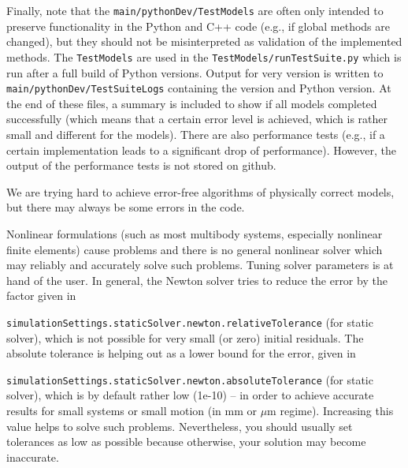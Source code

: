 Finally, note that the \texttt{main/pythonDev/TestModels} are often only intended to preserve functionality
in the Python and C++ code (e.g., if global methods are changed), but they should not be misinterpreted as validation of the 
implemented methods. The \texttt{TestModels} are used in the \codeName {} \texttt{TestModels/runTestSuite.py}
which is run after a full build of Python versions. Output for very version is written
to \texttt{main/pythonDev/TestSuiteLogs} containing the \codeName version and Python version. At the end of these
files, a summary is included to show if all models completed successfully (which means that a certain error level is achieved, which is rather small and different for the models).
There are also performance tests (e.g., if a certain implementation leads to a significant drop of performance).
However, the output of the performance tests is not stored on github.

We are trying hard to achieve error-free algorithms of physically correct models, but there may always be some errors in the code.

Nonlinear formulations (such as most multibody systems, especially nonlinear finite elements) cause problems and there is no general nonlinear solver which may reliably and accurately solve such problems.
Tuning solver parameters is at hand of the user. 
In general, the Newton solver tries to reduce the error by the factor given in 
\bi
  \item \texttt{simulationSettings.staticSolver.newton.relativeTolerance} (for static solver), 
\ei
which is not possible for very small (or zero) initial residuals. The absolute tolerance is helping out as a lower bound for the error, given in
\bi
  \item \texttt{simulationSettings.staticSolver.newton.absoluteTolerance} (for static solver),
\ei
which is by default rather low (1e-10) -- in order to achieve accurate results for small systems or small motion (in mm or $\mu$m regime). Increasing this value helps to solve such problems. Nevertheless, you should usually set tolerances as low as possible because otherwise, your solution may become inaccurate.

